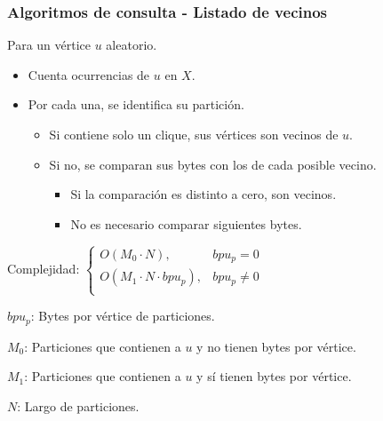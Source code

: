 \begin{frame}
\frametitle{Algoritmos de consulta - Listado de vecinos}

Para un vértice $u$ aleatorio.
\begin{itemize}
	\item Cuenta ocurrencias de $u$ en $X$.
	\item Por cada una, se identifica su partición.
	\begin{itemize}
		\footnotesize
		\item Si contiene solo un clique, sus vértices son vecinos de $u$.
		\item Si no, se comparan sus bytes con los de cada posible vecino.
		\begin{itemize}
			\footnotesize
			\item Si la comparación es distinto a cero, son vecinos.
			\item No es necesario comparar siguientes bytes.
		\end{itemize}	
	\end{itemize}
\end{itemize}

\vspace{6mm}
Complejidad: 
$\begin{cases}
	O(M_{0} \cdot N), & bpu_{p} = 0 \\
	O(M_{1} \cdot N \cdot bpu_{p}), & bpu_{p} \neq 0  \\
\end{cases}$

\vspace{3mm}
{\footnotesize
$bpu_{p}$: Bytes por vértice de particiones.

$M_{0}$: Particiones que contienen a $u$ y no tienen bytes por vértice.

$M_{1}$: Particiones que contienen a $u$ y  sí tienen bytes por vértice.

$N$: Largo de particiones.
}

\end{frame}



